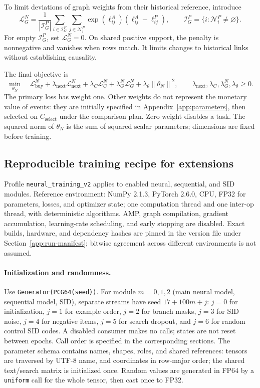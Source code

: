 \documentclass[12pt,a4paper]{article}
\newcommand{\code}[1]{{\ttfamily\small\nolinkurl{#1}}}
\newcommand{\norm}[1]{\left\lVert#1\right\rVert}
\theoremstyle{plainru}
\begin{document}
To limit deviations of graph weights from their historical reference,
introduce
\begin{equation}\label{eq:modern-graph-regularizer}
\mathcal L_G^N=
\frac1{|\mathcal I_G^P|}
\sum_{i\in\mathcal I_G^P}\sum_{j\in\mathcal N_i^P}
\exp(\ell_{ij}^{A})(\ell_{ij}^{A}-\ell_{ij}^{P}),\qquad
\mathcal I_G^P=\{i:\mathcal N_i^P\ne\varnothing\}.
\end{equation}
For empty $\mathcal I_G^P$, set $\mathcal L_G^N=0$.
On shared positive support, the penalty is nonnegative and vanishes
when rows match. It limits changes to historical links
without establishing causality.

The final objective is
\begin{equation}\label{eq:modern-total-loss}
\min_{\theta_N}\quad
\mathcal L_{\mathrm{buy}}^N
+\lambda_{\mathrm{next}}\mathcal L_{\mathrm{next}}^N
+\lambda_C\mathcal L_C^N
+\lambda_G^N\mathcal L_G^N
+\lambda_\theta\norm{\theta_N}^2,
\qquad\lambda_{\mathrm{next}},\lambda_C,\lambda_G^N,\lambda_\theta\ge0.
\end{equation}
The primary loss has weight one. Other weights do not represent
the monetary value of events: they are initially specified in Appendix~\ref{app:parameters},
then selected on $C_{\mathrm{select}}$ under the comparison plan. Zero weight disables a task.
The squared norm of $\theta_N$ is the sum of squared scalar parameters;
dimensions are fixed before training.

\subsection{Reproducible training recipe for extensions}
\label{sec:modern-training-recipe}

Profile \code{neural_training_v2} applies to enabled neural,
sequential, and SID modules. Reference environment: NumPy 2.1.3, PyTorch 2.6.0,
CPU, FP32 for parameters, losses, and optimizer state; one computation
thread and one inter-op thread, with deterministic algorithms.
AMP, graph compilation, gradient accumulation, learning-rate scheduling, and early
stopping are disabled. Exact builds, hardware, and dependency hashes
are pinned in the version file under Section~\ref{app:run-manifest};
bitwise agreement across different environments is not assumed.

\paragraph{Initialization and randomness.}
Use \code{Generator(PCG64(seed))}. For module $m=0,1,2$
(main neural model, sequential model, SID), separate
streams have seed $17+100m+j$: $j=0$ for initialization,
$j=1$ for example order, $j=2$ for branch masks,
$j=3$ for SID noise, $j=4$ for negative items,
$j=5$ for search dropout, and $j=6$ for random control SID codes.
A disabled consumer makes no calls; states are not reset
between epochs. Call order is specified in the corresponding sections.
The parameter schema contains names, shapes, roles, and shared references:
tensors are traversed by UTF-8 name, and coordinates in row-major order;
the shared text/search matrix is initialized once.
Random values are generated in FP64 by a \code{uniform} call for the whole
tensor, then cast once to FP32.
\end{document}
